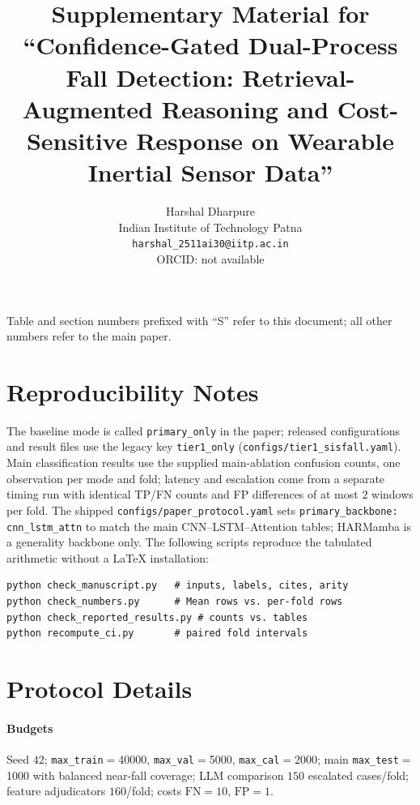 \documentclass[journal]{IEEEtran}
\begin{document}
\title{Supplementary Material for\\ ``Confidence-Gated Dual-Process Fall Detection: Retrieval-Augmented Reasoning and Cost-Sensitive Response on Wearable Inertial Sensor Data''}
\author{Harshal Dharpure\\Indian Institute of Technology Patna\\\texttt{harshal\_2511ai30@iitp.ac.in}\\ORCID: not available}
\maketitle

Table and section numbers prefixed with ``S'' refer to this document; all other numbers refer to the main paper.

\section{Reproducibility Notes}
\label{sup:repro}
The baseline mode is called \texttt{primary\_only} in the paper; released configurations and result files use the legacy key \texttt{tier1\_only} (\texttt{configs/tier1\_sisfall.yaml}). Main classification results use the supplied main-ablation confusion counts, one observation per mode and fold; latency and escalation come from a separate timing run with identical TP/FN counts and FP differences of at most $2$ windows per fold. The shipped \texttt{configs/paper\_protocol.yaml} sets \texttt{primary\_backbone: cnn\_lstm\_attn} to match the main CNN--LSTM--Attention tables; HARMamba is a generality backbone only. The following scripts reproduce the tabulated arithmetic without a LaTeX installation:
\begin{verbatim}
python check_manuscript.py   # inputs, labels, cites, arity
python check_numbers.py      # Mean rows vs. per-fold rows
python check_reported_results.py # counts vs. tables
python recompute_ci.py       # paired fold intervals
\end{verbatim}

\section{Protocol Details}
\label{sup:protocol}
\paragraph{Budgets} Seed $42$; \texttt{max\_train}${}={}$40000, \texttt{max\_val}${}={}$5000, \texttt{max\_cal}${}={}$2000; main \texttt{max\_test}${}={}$1000 with balanced near-fall coverage; LLM comparison $150$ escalated cases/fold; feature adjudicators $160$/fold; costs $\mathrm{FN}{=}10$, $\mathrm{FP}{=}1$.
\end{document}

